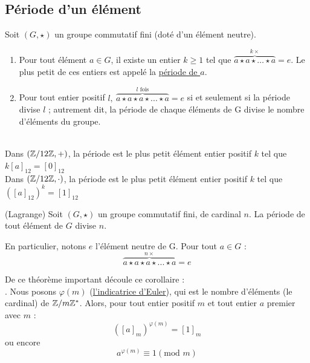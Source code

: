 \documentclass[11pt,a4paper]{article}
\renewcommand{\)}{\right)}
\renewcommand{\(}{\left(}
\begin{document}
\subsection{Période d'un élément}
Soit $(G,\star)$ un groupe commutatif fini (doté d'un élément neutre).
\begin{enumerate}
	\item Pour tout élément $a \in G$, il existe un entier $k \geq 1$ tel que $\overbrace{a\star a \star \ldots \star a}^{k\times} = e$. Le plus petit de ces entiers est appelé la \uline{période de $a$}.
	\item Pour tout entier positif $l,\ \overbrace{a\star a\star a \star...\star a}^{l\text{ fois}} = e$ si et seulement si la période divise $l$ ; autrement dit, la période de chaque éléments de G divise le nombre d'éléments du groupe.
\end{enumerate}
\begin{exemple}[0.85]~\\
	Dans $(\mathbb{Z}/12\mathbb{Z},+)$, la période est le plus petit élément entier positif $k$ tel que $k[a]_{12} = [0]_{12}$\\
	Dans $(\mathbb{Z}/12\mathbb{Z},\cdot)$, la période est le plus petit élément entier positif $k$ tel que $([a]_{12})^k = [1]_{12}$
\end{exemple}
 (Lagrange) Soit $(G,\star)$ un groupe commutatif fini, de cardinal $n$. La période de tout élément de $G$ divise $n$.

En particulier, notons $e$ l'élément neutre de G. Pour tout $a  \in G$ : \[\overbrace{a\star a \star a \star...\star a}^{n\times} = e\]

De ce théorème important découle ce corollaire :\\
. Nous posons $\varphi(m)$ (\uline{l'indicatrice d'Euler}), qui est le nombre d'éléments (le cardinal) de $\mathbb{Z}/m\mathbb{Z}^*$.  Alors, pour tout entier positif $m$ et tout entier $a$ premier avec $m$ :
\[([a]_m)^{\varphi(m)} = [1]_m\]
ou encore
\[a^{\varphi(m)} \equiv 1 (\text{mod }m)\]
\newpage
\end{document}

